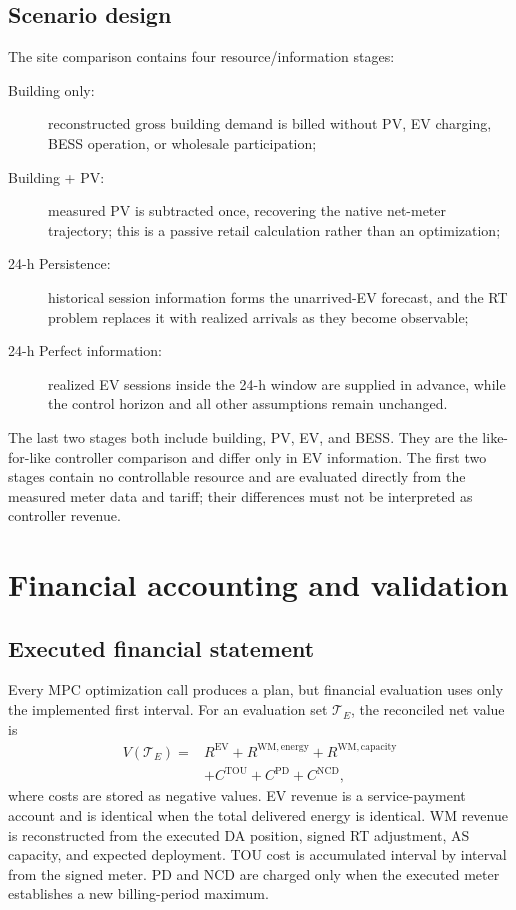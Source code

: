 \documentclass[final,5p,times]{elsarticle}
\newcommand{\EV}{\mathrm{EV}}
\newcommand{\TOU}{\mathrm{TOU}}
\newcommand{\PD}{\mathrm{PD}}
\newcommand{\NCD}{\mathrm{NCD}}
\newcommand{\WM}{\mathrm{WM}}
\begin{document}
\subsection{Scenario design}
The site comparison contains four resource/information stages:
\begin{description}
  \item[Building only:] reconstructed gross building demand is billed without PV, EV charging, BESS operation, or wholesale participation;
  \item[Building + PV:] measured PV is subtracted once, recovering the native net-meter trajectory; this is a passive retail calculation rather than an optimization;
  \item[24-h Persistence:] historical session information forms the unarrived-EV forecast, and the RT problem replaces it with realized arrivals as they become observable;
  \item[24-h Perfect information:] realized EV sessions inside the 24-h window are supplied in advance, while the control horizon and all other assumptions remain unchanged.
\end{description}
The last two stages both include building, PV, EV, and BESS. They are the like-for-like controller comparison and differ only in EV information. The first two stages contain no controllable resource and are evaluated directly from the measured meter data and tariff; their differences must not be interpreted as controller revenue.

\section{Financial accounting and validation}
\label{sec:accounting}

\subsection{Executed financial statement}
Every MPC optimization call produces a plan, but financial evaluation uses only the implemented first interval. For an evaluation set $\mathcal T_E$, the reconciled net value is
\begin{align}
V(\mathcal T_E)={}&R^{\EV}+R^{\WM,\mathrm{energy}}
+R^{\WM,\mathrm{capacity}}\nonumber\\
&+C^{\TOU}+C^{\PD}+C^{\NCD},
\label{eq:financial_identity}
\end{align}
where costs are stored as negative values. EV revenue is a service-payment account and is identical when the total delivered energy is identical. WM revenue is reconstructed from the executed DA position, signed RT adjustment, AS capacity, and expected deployment. TOU cost is accumulated interval by interval from the signed meter. PD and NCD are charged only when the executed meter establishes a new billing-period maximum.
\end{document}
